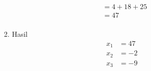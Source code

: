 \documentclass[xcolor=table]{uofa-eng-assignment}
\begin{document}
\begin{enumerate}
\begin{enumerate}
\begin{enumerate}
\begin{equation}
\begin{split}
                                      & = 4+18+25 \\
                                      & = 47 \\
                                  \end{split}
                              \end{equation}
                        \item Hasil
                              \begin{equation}
                                  \begin{split}
                                      x_1 & = 47 \\
                                      x_2 & = -2 \\
                                      x_3 & = -9 \\
                                  \end{split}
                              \end{equation}
                    \end{enumerate}


\end{enumerate}
\end{enumerate}
\end{document}
